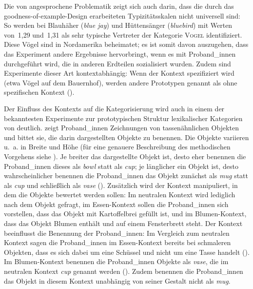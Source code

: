 Die von \textcite{Poitou.2004b} angesprochene Problematik zeigt sich auch darin, dass die durch das goodness-of-example-Design erarbeiteten Typizitätsskalen nicht universell sind: So werden bei \textcite[232]{Rosch.1975b} Blauhäher (\textit{blue jay}) und Hüttensänger (\textit{bluebird}) mit Werten von~1,29 und~1,31 als sehr typische Vertreter der Kategorie \textsc{Vogel} identifiziert. Diese Vögel sind in Nordamerika beheimatet; es ist somit davon auszugehen, dass das Experiment andere Ergebnisse hervorbringt, wenn es mit Proband\_innen durchgeführt wird, die in anderen Erdteilen sozialisiert wurden. Zudem sind Experimente dieser Art kontextabhängig: Wenn der Kontext spezifiziert wird (etwa Vögel auf dem Bauernhof), werden andere Prototypen genannt als ohne spezifischen Kontext (\cite[35--36]{Schmid.2000}).

Der Einfluss des Kontexts auf die Kategorisierung wird auch in einem der bekanntesten Experimente zur prototypischen Struktur lexikalischer Kategorien von \textcite{Labov.2004} deutlich. \textcite{Labov.2004} zeigt Proband\_innen Zeichnungen von tassenähnlichen Objekten und bittet sie, die darin dargestellten Objekte zu benennen. Die Objekte variieren u.~a. in Breite und Höhe (für eine genauere Beschreibung des methodischen Vorgehens siehe \cite[76--78]{Labov.2004}). Je breiter das dargestellte Objekt ist, desto eher benennen die Proband\_innen dieses als \textit{bowl} statt als \textit{cup}; je länglicher ein Objekt ist, desto wahrscheinlicher benennen die Proband\_innen das Objekt zunächst als \textit{mug} statt als \textit{cup} und schließlich als \textit{vase} (\cite[78--79]{Labov.2004}). Zusätzlich wird der Kontext manipuliert, in dem die Objekte bewertet werden sollen: Im neutralen Kontext wird lediglich nach dem Objekt gefragt, im Essen-Kontext sollen die Proband\_innen sich vorstellen, dass das Objekt mit Kartoffelbrei gefüllt ist, und im Blumen-Kontext, dass das Objekt Blumen enthält und auf einem Fensterbrett steht. Der Kontext beeinflusst die Benennung der Proband\_innen: Im Vergleich zum neutralen Kontext sagen die Proband\_innen im Essen-Kontext bereits bei schmaleren Objekten, dass es sich dabei um eine Schüssel und nicht um eine Tasse handelt (\cite[78--79]{Labov.2004}). Im Blumen-Kontext benennen die Proband\_innen Objekte als \textit{vase}, die im neutralen Kontext \textit{cup} genannt werden (\cite[79--80]{Labov.2004}). Zudem benennen die Proband\_innen das Objekt in diesem Kontext unabhängig von seiner Gestalt nicht als \textit{mug}.

